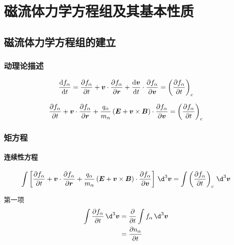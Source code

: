 
\chapter{磁流体力学方程组及其基本性质}

\section{磁流体力学方程组的建立}

\subsection{动理论描述}

\begin{equation}
    \frac{\mathop{}\!\mathrm{d} {f_\alpha}}{\mathop{}\!\mathrm{d} {t}} = \frac{\partial {f_\alpha}}{\partial {t}} + \bm{v} \cdot \frac{\partial {f_\alpha}}{\partial {\bm{r}}} + \frac{\mathop{}\!\mathrm{d} {\bm{v}}}{\mathop{}\!\mathrm{d} {t}} \cdot \frac{\partial {f_\alpha}}{\partial {\bm{v}}} = \left( \frac{\partial {f_\alpha}}{\partial {t}} \right)_c
\end{equation}

\begin{equation}
    \frac{\partial {f_\alpha}}{\partial {t}} + \bm{v} \cdot \frac{\partial {f_\alpha}}{\partial {\bm{r}}} + \frac{q_\alpha}{m_\alpha} \left( \bm{E} + \bm{v} \times \bm{B} \right) \cdot \frac{\partial {f_\alpha}}{\partial {\bm{v}}} = \left( \frac{\partial {f_\alpha}}{\partial {t}} \right)_c
\end{equation}

\subsection{矩方程}

\subsubsection{连续性方程}

\begin{equation}
    \int \left[
        \pDeriv{f_\alpha}{t} + \vector{v} \cdot \pDeriv{f_\alpha}{\vector{r}} + \frac{q_\alpha}{m_\alpha} \left( \vector{E} + \vector{v} \times \vector{B} \right) \cdot \pDeriv{f_\alpha}{\vector{v}}
    \right] \, \d^3 \vector{v}
    = \int \left( \pDeriv{f_\alpha}{t} \right)_c \, \d^3 \vector{v}
\end{equation}

第一项
\begin{equation}\begin{aligned}
    \int \pDeriv{f_\alpha}{t} \, \d^3 \vector{v}
    &= \pDeriv{}{t} \int f_\alpha \, \d^3 \vector{v} \\
    &= \pDeriv{n_\alpha}{t}
\end{aligned}\end{equation}

